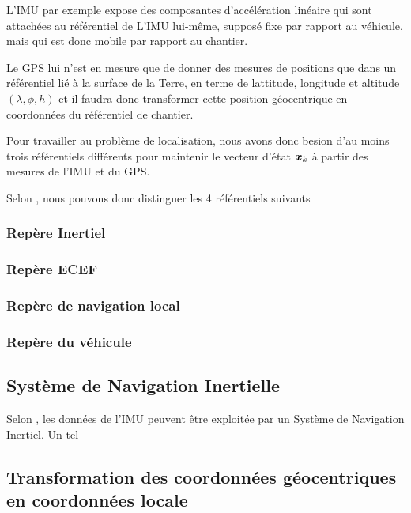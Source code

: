 \documentclass[12pt,a4paper]{report}
\begin{document}
	\para L'IMU par exemple expose des composantes d'accélération linéaire qui sont attachées au référentiel de L'IMU lui-même, supposé fixe par rapport au véhicule, mais qui est donc mobile par rapport au chantier.
	
	\para Le GPS lui n'est en mesure que de donner des mesures de positions que dans un référentiel lié à la surface de la Terre, en terme de lattitude, longitude et altitude $(\lambda, \phi, h)$ et il faudra donc transformer cette position géocentrique en coordonnées du référentiel de chantier.
	
	\para Pour travailler au problème de localisation, nous avons donc besion d'au moins trois référentiels différents pour maintenir le vecteur d'état $\boldsymbol{x}_k$ à partir des mesures de l'IMU et du GPS.
	
	\para Selon \cite{gustavsson_uav_2015}, nous pouvons donc distinguer les 4 référentiels suivants
	
	\subsubsection{Repère Inertiel}
	
	\subsubsection{Repère ECEF}
	
	\subsubsection{Repère de navigation local}
	
	\subsubsection{Repère du véhicule}
	
				
	\subsection{Système de Navigation Inertielle}
	
	\para Selon \cite{gustavsson_uav_2015}, les données de l'IMU peuvent être exploitée par un Système de Navigation Inertiel. Un tel 
	
	
	\subsection{Transformation des coordonnées géocentriques en coordonnées locale}
	
\end{document}
